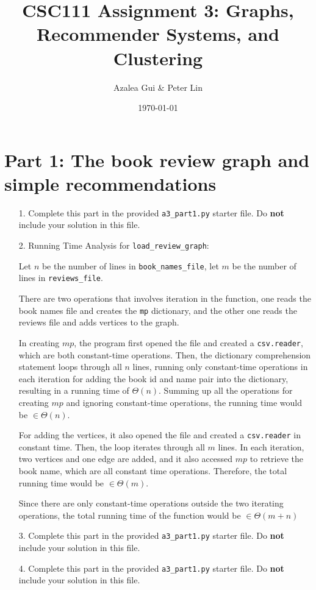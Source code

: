 \documentclass[11pt]{article}
\title{CSC111 Assignment 3: Graphs, Recommender Systems, and Clustering}
\author{Azalea Gui \& Peter Lin}
\date{\today}
\begin{document}
\maketitle

\section*{Part 1: The book review graph and simple recommendations}

\begin{enumerate}

\item[1.]
Complete this part in the provided \texttt{a3\_part1.py} starter file.
Do \textbf{not} include your solution in this file.

\item[2.]
Running Time Analysis for \texttt{load\_review\_graph}:

Let $n$ be the number of lines in \texttt{book\_names\_file}, let $m$ be the number of lines in \texttt{reviews\_file}.

There are two operations that involves iteration in the function, one reads the book names file and creates the \texttt{mp} dictionary, and the other one reads the reviews file and adds vertices to the graph.

In creating $mp$, the program first opened the file and created a \texttt{csv.reader}, which are both constant-time operations. Then, the dictionary comprehension statement loops through all $n$ lines, running only constant-time operations in each iteration for adding the book id and name pair into the dictionary, resulting in a running time of $\Theta(n)$. Summing up all the operations for creating $mp$ and ignoring constant-time operations, the running time would be $\in \Theta(n)$.

For adding the vertices, it also opened the file and created a \texttt{csv.reader} in constant time. Then, the loop iterates through all $m$ lines. In each iteration, two vertices and one edge are added, and it also accessed $mp$ to retrieve the book name, which are all constant time operations. Therefore, the total running time would be $\in \Theta(m)$.

Since there are only constant-time operations outside the two iterating operations, the total running time of the function would be $\in \Theta(m + n)$

\item[3.]
Complete this part in the provided \texttt{a3\_part1.py} starter file.
Do \textbf{not} include your solution in this file.

\item[4.]
Complete this part in the provided \texttt{a3\_part1.py} starter file.
Do \textbf{not} include your solution in this file.

\end{enumerate}
\end{document}
